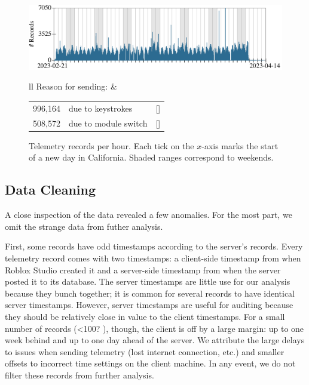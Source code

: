 \documentclass[english,submission,cleveref]{programming}
\begin{document}
\begin{figure}[t]\centering
  \includegraphics[width=\columnwidth]{img/row-distribution.pdf}
  \begin{tabular}{ll}
    Reason for sending:
    &
    \begin{tabular}[t]{r@{~~}l@{~~}r}
      996,164 & due to keystrokes  & [\pct{66.20}] \\
      508,572 & due to module switch & [\pct{33.80}]
    \end{tabular}
  \end{tabular}
  \caption{Telemetry records per hour. Each tick on the $x$-axis marks the start of a new day in California. Shaded ranges correspond to weekends.}
  \label{f:records-per-hour}
\end{figure}


\subsection{Data Cleaning}
\label{s:data-cleaning}

A close inspection of the data revealed a few anomalies.
For the most part, we omit the strange data from futher
analysis.

First, some records have odd timestamps according to the server's records.
Every telemetry record comes with two timestamps: a client-side timestamp
from when Roblox Studio created it and a server-side timestamp from when
the server posted it to its database.
The server timestamps are little use for our analysis because they bunch
together; it is common for several records to have identical server
timestamps.
However, server timestamps are useful for auditing because they should
be relatively close in value to the client timestamps.
For a small number of records (<100? \FILL{}), though, the client is off by a large
margin: up to one week behind and up to one day ahead of the server.
We attribute the large delays to issues when sending telemetry (lost internet
connection, etc.) and smaller offsets to incorrect time settings on the client
machine.
In any event, we do not filter these records from further
analysis.
\end{document}
